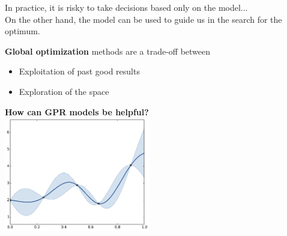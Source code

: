\documentclass{beamer}
\begin{document}
\begin{frame}{}
\begin{figure}
    \end{figure}
In practice, it is risky to take decisions based only on the model...\\
\vspace{3mm}
On the other hand, the model can be used to guide us in the search for the optimum.
\end{frame}

\begin{frame}{}
\textbf{Global optimization} methods are a trade-off between
\begin{itemize}
	\item Exploitation of past good results
	\item Exploration of the space
\end{itemize}
\vspace{3mm}
\begin{center}
\textbf{How can GPR models be helpful?}\\
\includegraphics[height=5cm]{figures/python/ego_0}
\end{center}
\end{frame}
\end{document}
